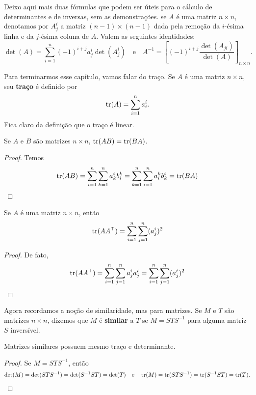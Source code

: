 Deixo aqui mais duas fórmulas que podem ser úteis para o cálculo de determinantes e de inversas, sem as demonstrações. se $A$ é uma matriz $n \times n$, denotamos por $A^i_j$ a matriz $(n-1) \times (n-1)$ dada pela remoção da $i$-ésima linha e da $j$-ésima coluna de $A$. Valem as seguintes identidades: \begin{equation}
    \det(A) = \sum_{i = 1}^n (-1)^{i + j} a^i_j \det(A^i_j) \quad \text{e} \quad A^{-1} = \left[(-1)^{i + j}\frac{\det(A_{ji})}{\det(A)}\right]_{n \times n}.
\end{equation}

Para terminarmos esse capítulo, vamos falar do traço. Se $A$ é uma matriz $n \times n$, seu \textbf{traço} é definido por \begin{equation}
    \operatorname{tr}(A) = \sum_{i = 1}^n a^i_i.
\end{equation} Fica claro da definição que o traço é linear.

\begin{proposition}
    Se $A$ e $B$ são matrizes $n \times n$, $\operatorname{tr}(AB) = \operatorname{tr}(BA)$.
\end{proposition}
\begin{proof}
    Temos \begin{equation}
        \operatorname{tr}(AB) = \sum_{i = 1}^n \sum_{k = 1}^n a^i_k b^k_i = \sum_{k = 1}^n \sum_{i = 1}^n a^k_i b^i_k = \operatorname{tr}(BA)
    \end{equation}
\end{proof}

\begin{proposition}
    Se $A$ é uma matriz $n \times n$, então \begin{equation}
        \operatorname{tr}(AA^\top) = \sum_{i = 1}^n \sum_{j = 1}^n (a^i_j)^2
    \end{equation}
\end{proposition}
\begin{proof}
    De fato, \begin{equation}
        \operatorname{tr}(AA^\top) = \sum_{i = 1}^n \sum_{j = 1}^n a^i_j a^i_j = \sum_{i = 1}^n \sum_{j = 1}^n (a^i_j)^2
    \end{equation}
\end{proof}

Agora recordamos a noção de similaridade, mas para matrizes. Se $M$ e $T$ são matrizes $n \times n$, dizemos que $M$ é \textbf{similar} a $T$ se $M = STS^{-1}$ para alguma matriz $S$ inversível.

\begin{proposition}
    Matrizes similares possuem mesmo traço e determinante.
\end{proposition}
\begin{proof}
    Se $M = STS^{-1}$, então \begin{align}
        \det(M) = \det(STS^{-1}) = \det(S^{-1}ST) = \det(T) \quad \text{e} \quad \operatorname{tr}(M) = \operatorname{tr}(STS^{-1}) = \operatorname{tr}(S^{-1}ST) = \operatorname{tr}(T).
    \end{align}
\end{proof}


